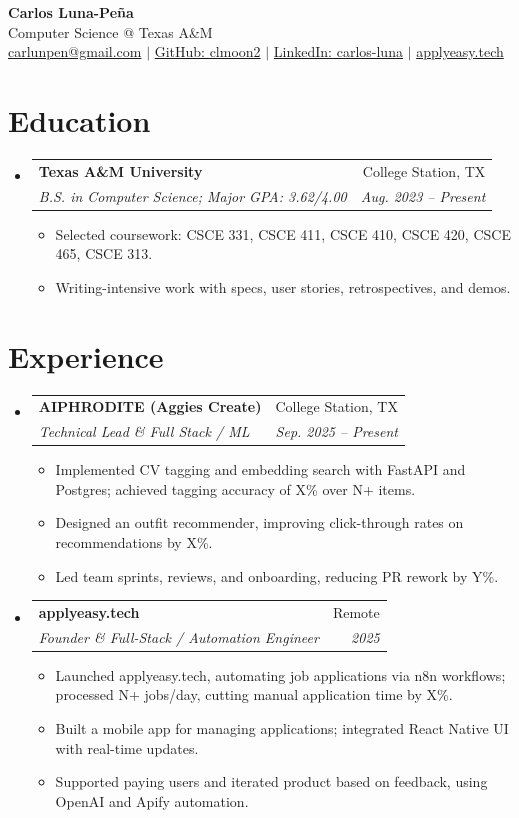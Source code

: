\documentclass[letterpaper,11pt]{article}
\makeatletter
\newcommand{\resumeItem}[1]{
  \item\small{{#1 \vspace{-2pt}}}
}
\newcommand{\resumeSubheading}[4]{
  \vspace{-2pt}\item
  \begin{tabular*}{0.97\textwidth}[t]{l@{\extracolsep{\fill}}r}
    \textbf{#1} & #2 \\
    \textit{\small#3} & \textit{\small #4} \\
  \end{tabular*}\vspace{-7pt}
}
\newcommand{\resumeSubHeadingListStart}{\begin{itemize}[leftmargin=0.15in, label={}]}
\newcommand{\resumeSubHeadingListEnd}{\end{itemize}}
\newcommand{\resumeItemListStart}{\begin{itemize}}
\newcommand{\resumeItemListEnd}{\end{itemize}\vspace{-5pt}}
\makeatother
\begin{document}
\begin{center}
  \textbf{\huge Carlos Luna-Peña} \\
  \vspace{2pt}
  Computer Science @ Texas A\&M \\
  \vspace{2pt}
  \href{mailto:carlunpen@gmail.com}{carlunpen@gmail.com} $|$ 
  \href{https://github.com/clmoon2}{GitHub: clmoon2} $|$ 
  \href{https://linkedin.com/in/carlos-luna}{LinkedIn: carlos-luna} $|$ 
  \href{applyeasy.tech}{applyeasy.tech} \\
\end{center}

\section{Education}
\resumeSubHeadingListStart
\resumeSubheading
  {Texas A\&M University}{College Station, TX}
  {B.S. in Computer Science; Major GPA: 3.62/4.00}{Aug. 2023 -- Present}
\resumeItemListStart
\resumeItem{Selected coursework: CSCE 331, CSCE 411, CSCE 410, CSCE 420, CSCE 465, CSCE 313.}
\resumeItem{Writing-intensive work with specs, user stories, retrospectives, and demos.}
\resumeItemListEnd
\resumeSubHeadingListEnd

\section{Experience}
\resumeSubHeadingListStart
\resumeSubheading
  {AIPHRODITE (Aggies Create)}{College Station, TX}
  {Technical Lead \& Full Stack / ML}{Sep. 2025 -- Present}
\resumeItemListStart
\resumeItem{Implemented CV tagging and embedding search with FastAPI and Postgres; achieved tagging accuracy of {X}\% over {N}+ items.}
\resumeItem{Designed an outfit recommender, improving click-through rates on recommendations by {X}\%.}
\resumeItem{Led team sprints, reviews, and onboarding, reducing PR rework by {Y}\%.}
\resumeItemListEnd

\resumeSubheading
  {applyeasy.tech}{Remote}
  {Founder \& Full-Stack / Automation Engineer}{2025}
\resumeItemListStart
\resumeItem{Launched applyeasy.tech, automating job applications via n8n workflows; processed {N}+ jobs/day, cutting manual application time by {X}\%.}
\resumeItem{Built a mobile app for managing applications; integrated React Native UI with real-time updates.}
\resumeItem{Supported paying users and iterated product based on feedback, using OpenAI and Apify automation.}
\resumeItemListEnd
\resumeSubHeadingListEnd
\end{document}
